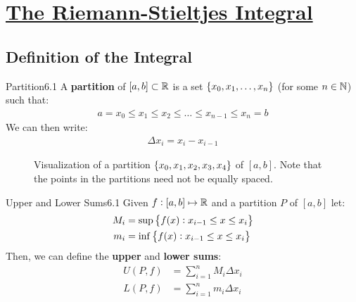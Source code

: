 \section[The Riemann-Stieltjes Integral]{\hyperlink{toc}{The Riemann-Stieltjes Integral}}

\subsection{Definition of the Integral}
\begin{definition}{Partition}{6.1}
    A \textbf{partition} of $[a, b] \subset \mathbb{R}$ is a set $\set{x_0, x_1, \ldots, x_n}$ (for some $n \in \mathbb{N}$) such that:
    \begin{align*}
        a = x_0 \leq x_1 \leq x_2 \leq \ldots \leq x_{n-1} \leq x_n = b
    \end{align*}
    We can then write:
    \begin{align*}
        \Delta x_i = x_i - x_{i-1} 
    \end{align*}
\end{definition}

\begin{figure}[htbp]
    \centering
    \caption{Visualization of a partition $\set{x_0, x_1, x_2, x_3, x_4}$ of $[a, b]$. Note that the points in the partitions need not be equally spaced.}
    \label{fig27}
\end{figure}

\setcounter{rudin}{0}
\begin{definition}{Upper and Lower Sums}{6.1}
    Given $f: [a, b] \mapsto \mathbb{R}$ and a partition $P$ of $[a, b]$ let:
    \begin{align*}
        M_i &= \sup\set{f(x): x_{i-1} \leq x \leq x_i}
        \\ m_i &= \inf\set{f(x): x_{i-1} \leq x \leq x_i}
    \end{align*}
    Then, we can define the \textbf{upper} and \textbf{lower sums}:
    \begin{align*}
        U(P, f) &= \sum_{i=1}^n M_i \Delta x_i
        \\ L(P, f) &= \sum_{i=1}^n m_i \Delta x_i
    \end{align*}
\end{definition}

